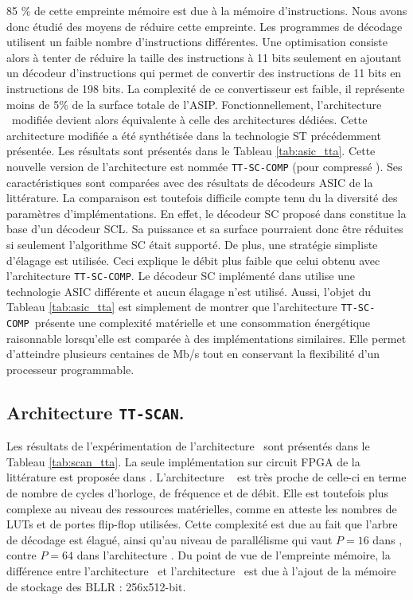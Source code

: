 85 \% de cette empreinte mémoire est due à la mémoire d'instructions. Nous avons donc étudié des moyens de réduire cette empreinte. Les programmes de décodage utilisent un faible nombre d'instructions différentes. Une optimisation consiste alors à tenter de réduire la taille des instructions à 11 bits seulement en ajoutant un décodeur d'instructions qui permet de convertir des instructions de 11 bits en instructions de 198 bits. La complexité de ce convertisseur est faible, il représente moins de 5\% de la surface totale de l'ASIP. Fonctionnellement, l'architecture \TTSC~modifiée devient alors équivalente à celle des architectures dédiées. Cette architecture modifiée a été synthétisée dans la technologie ST précédemment présentée. Les résultats sont présentés dans le Tableau \ref{tab:asic_tta}. Cette nouvelle version de l'architecture est nommée \texttt{TT-SC-COMP} (pour \og compressé \fg). Ses caractéristiques sont comparées avec des résultats de décodeurs ASIC de la littérature. La comparaison est toutefois difficile compte tenu du la diversité des paramètres d'implémentations. En effet, le décodeur SC proposé dans \cite{giard_polarbear:_2017} constitue la base d'un décodeur SCL. Sa puissance et sa surface pourraient donc être réduites si seulement l'algorithme SC était supporté. De plus, une stratégie simpliste d'élagage est utilisée. Ceci explique le débit plus faible que celui obtenu avec l'architecture \texttt{TT-SC-COMP}. Le décodeur SC implémenté dans \cite{mishra_successive_2012} utilise une technologie ASIC différente et aucun élagage n'est utilisé. Aussi, l'objet du Tableau \ref{tab:asic_tta} est simplement de montrer que l’architecture \texttt{TT-SC-COMP}~présente une complexité matérielle et une consommation énergétique raisonnable lorsqu'elle est comparée à des implémentations similaires. Elle permet d'atteindre plusieurs centaines de Mb/s tout en conservant la flexibilité d'un processeur programmable.


\subsection{Architecture \texttt{TT-SCAN}.}

Les résultats de l'expérimentation de l'architecture \TTSCAN~sont présentés dans le Tableau \ref{tab:scan_tta}. La seule implémentation sur circuit FPGA de la littérature est proposée dans \cite{berhault_hardware_2015}. L'architecture \TTSCAN~ est très proche de celle-ci en terme de nombre de cycles d'horloge, de fréquence et de débit. Elle est toutefois plus complexe au niveau des ressources matérielles, comme en atteste les nombres de LUTs et de portes flip-flop utilisées. Cette complexité est due au fait que l'arbre de décodage est élagué, ainsi qu'au niveau de parallélisme qui vaut $P=16$ dans \cite{berhault_hardware_2015}, contre $P=64$ dans l'architecture \TTSCAN. Du point de vue de l'empreinte mémoire, la différence entre l'architecture \TTSC~et l'architecture \TTSCAN~est due à l'ajout de la mémoire de stockage des BLLR : 256x512-bit.

